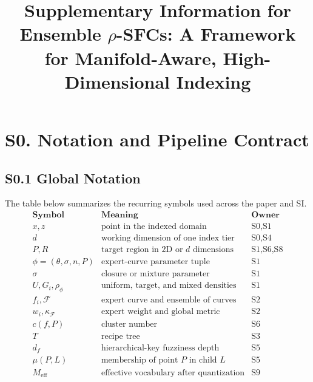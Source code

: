 \documentclass[11pt]{article}
\title{Supplementary Information for\\ Ensemble $\rho$-SFCs: A Framework for Manifold-Aware, High-Dimensional Indexing}
\author{}
\date{}
\newcommand{\kappaf}{\kappa_{\mathcal F}}
\begin{document}
\maketitle

\section*{S0. Notation and Pipeline Contract}
\label{sec:si-notation}

\subsection*{S0.1 Global Notation}
The table below summarizes the recurring symbols used across the paper and SI.
\[
\begin{array}{lll}
\textbf{Symbol} & \textbf{Meaning} & \textbf{Owner}\\
\hline
x,z & \text{point in the indexed domain} & \text{S0,S1}\\
d & \text{working dimension of one index tier} & \text{S0,S4}\\
P,R & \text{target region in 2D or }d\text{ dimensions} & \text{S1,S6,S8}\\
\phi=(\theta,\sigma,n,P) & \text{expert-curve parameter tuple} & \text{S1}\\
\sigma & \text{closure or mixture parameter} & \text{S1}\\
U,G_i,\rho_\phi & \text{uniform, target, and mixed densities} & \text{S1}\\
f_i,\mathcal F & \text{expert curve and ensemble of curves} & \text{S2}\\
w_i,\kappaf & \text{expert weight and global metric} & \text{S2}\\
c(f,P) & \text{cluster number} & \text{S6}\\
T & \text{recipe tree} & \text{S3}\\
d_f & \text{hierarchical-key fuzziness depth} & \text{S5}\\
\mu(P,L) & \text{membership of point }P\text{ in child }L & \text{S5}\\
M_{\mathrm{eff}} & \text{effective vocabulary after quantization} & \text{S9}
\end{array}
\]
\end{document}

